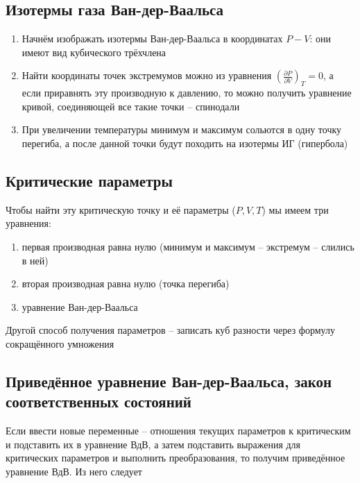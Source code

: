 \documentclass[a4paper, 14pt]{article}
\begin{document}
    \subsection{Изотермы газа Ван-дер-Ваальса}

    \begin{enumerate}
        \item Начнём изображать изотермы Ван-дер-Ваальса в координатах $P - V$: они имеют вид кубического трёхчлена
        \item Найти координаты точек экстремумов можно из уравнения $(\frac{\partial P}{\partial V})_T = 0$, а если
        приравнять эту производную к давлению, то можно получить уравнение кривой, соединяющей все такие точки --
        спинодали
        \item При увеличении температуры минимум и максимум сольются в одну точку перегиба, а после данной точки
        будут походить на изотермы ИГ (гипербола)
    \end{enumerate}

    \subsection{Критические параметры}

    Чтобы найти эту критическую точку и её параметры ($P, V, T$) мы имеем три уравнения:

    \begin{enumerate}
        \item первая производная равна нулю (минимум и максимум -- экстремум -- слились в ней)
        \item вторая производная равна нулю (точка перегиба)
        \item уравнение Ван-дер-Ваальса
    \end{enumerate}

    Другой способ получения параметров -- записать куб разности через формулу сокращённого умножения

    \subsection{Приведённое уравнение Ван-дер-Ваальса, закон соответственных состояний}

    Если ввести новые переменные -- отношения текущих параметров к критическим и подставить их в уравнение ВдВ, а
    затем подставить выражения для критических параметров и выполнить преобразования, то получим приведённое
    уравнение ВдВ.
    Из него следует
\end{document}
